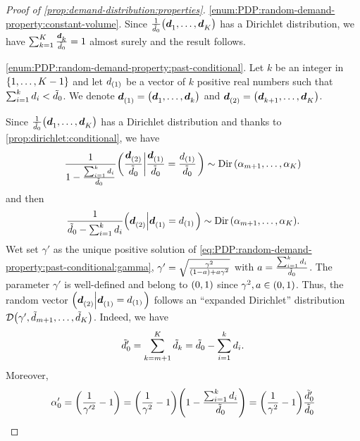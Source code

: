 \begin{proof}[Proof of \cref{prop:demand-distribution:properties}]
\cref{enum:PDP:random-demand-property:constant-volume}.
Since $\frac{1}{\tilde{\demand}_0}\bracket{\va\demand_1,\ldots,\va\demand_K}$ has a Dirichlet distribution, we have $\sum_{k=1}^K \frac{\va\demand_k}{\tilde{\demand}_0}=1$ almost surely and the result follows.


\cref{enum:PDP:random-demand-property:past-conditional}.
Let $k$ be an integer in $\range[1]{K-1}$ and let $d_{(1)}$ be a vector of $k$ positive real numbers such that $\sum_{i=1}^k d_i < \tilde{d}_0$.
We denote $\va\demand_{(1)}=\bracket{\va\demand_1,\ldots,\va\demand_k}$ and $\va\demand_{(2)}=\bracket{\va\demand_{k+1},\ldots,\va\demand_K}$.


Since $\frac{1}{\tilde{\demand}_0}\bracket{\va\demand_1,\ldots,\va\demand_K}$ has a Dirichlet distribution and thanks to \cref{prop:dirichlet:conditional}, we have
\begin{equation}
\frac{1}{ 1- \frac{ \sum_{i=1}^k \demand_i }{ \tilde{\demand}_0 } }
\left(
\frac{ \va\demand_{(2)} }{ \tilde{\demand}_0 }
\left|
\frac{ \va\demand_{(1)} }{ \tilde{\demand}_0 } = \frac{ \demand_{(1)} }{ \tilde{\demand}_0 }
\right.
\right)
\sim
\Dir\bracket{\alpha_{m+1},\ldots,\alpha_K}
\end{equation}
and then
\begin{equation}
\frac{1}{ \tilde{\demand}_0 - \sum_{i=1}^k \demand_i }
\left(
\va\demand_{(2)}
\left|
\va\demand_{(1)} = \demand_{(1)}
\right.
\right)
\sim
\Dir\bracket{\alpha_{m+1},\ldots,\alpha_K}.
\end{equation}
Wet set $\gamma'$ as the unique positive solution of \cref{eq:PDP:random-demand-property:past-conditional:gamma}, \ie $\gamma' = \sqrt{\frac{\gamma^2}{\bracket{1-a}+a\gamma^2}}$ with $a = \frac{\sum_{i=1}^k d_i}{\tilde{d}_0}$.
The parameter $\gamma'$ is well-defined and belong to $\bracket{0,1}$ since $\gamma^2,a\in\bracket{0,1}$.
Thus, the random vector
$
\left(
\va\demand_{(2)}
\left|
\va\demand_{(1)} = \demand_{(1)}
\right.
\right)
$
follows an ``expanded Dirichlet'' distribution $\cD\bracket{\gamma',\tilde{\demand}_{m+1},\ldots,\tilde{\demand}_K}$.
Indeed, we have
\begin{equation}
  \tilde{d}_0' = \sum_{k=m+1}^K \tilde{d}_k = \tilde{d}_0 - \sum_{i=1}^k d_i.
\end{equation}
Moreover,
\begin{equation}
  \alpha_0'
  = \bracket{\frac{1}{\gamma'^2}-1}
  = \bracket{\frac{1}{\gamma^2}-1}\bracket{1-\frac{\sum_{i=1}^k \demand_i}{\tilde{\demand}_0}}
  = \bracket{\frac{1}{\gamma^2}-1}\frac{\tilde{\demand}_0'}{\tilde{\demand}_0}

\end{equation}
\end{proof}
